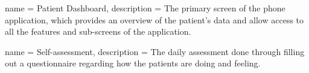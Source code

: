 





{
    name = Patient Dashboard,
    description = {The primary screen of the phone application, which provides an overview of the patient's data and allow access to all the features and sub-screens of the application.}
}

{
    name = Self-assessment,
    description = {The daily assessment done through filling out a questionnaire regarding how the patients are doing and feeling.}
}










